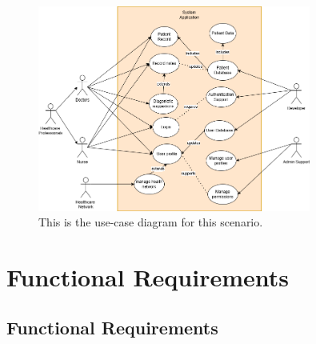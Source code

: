 \documentclass[12pt]{article}
\begin{document}
\begin{figure}[H]
  \includegraphics[width=0.8\textwidth]{use-case.drawio.png}
  \caption{This is the use-case diagram for this scenario.}
  \label{fig:Use-Case Diagram}
\end{figure}


\section{Functional Requirements}
\subsection{Functional Requirements}
\end{document}
